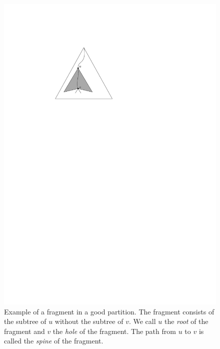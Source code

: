 \documentclass[11pt,a4paper]{article}
\theoremstyle{definition}
\theoremstyle{remark}
\begin{document}
\begin{figure}
\begin{center}
\includegraphics[scale=0.7]{fragment}
\end{center}
\caption{Example of a fragment in a good partition. The fragment consists of the subtree of $u$ without the subtree of $v$. We call $u$ the \emph{root} of the fragment and $v$ the \emph{hole} of the fragment. The path from $u$ to $v$ is called the \emph{spine} of the fragment.}
\end{figure}
\end{document}
